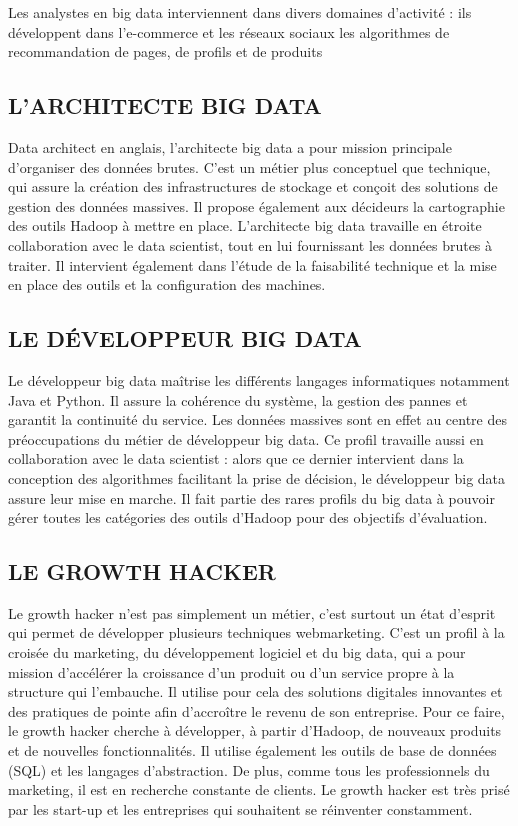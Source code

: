 Les analystes en big data interviennent dans divers domaines d’activité : ils développent dans l’e-commerce et les réseaux sociaux les algorithmes de recommandation de pages, de profils et de produits

\subsection{L’ARCHITECTE BIG DATA}
Data architect en anglais, l’architecte big data a pour mission principale d’organiser des données brutes. C’est un métier plus conceptuel que technique, qui assure la création des infrastructures de stockage et conçoit des solutions de gestion des données massives. Il propose également aux décideurs la cartographie des outils Hadoop à mettre en place. L’architecte big data travaille en étroite collaboration avec le data scientist, tout en lui fournissant les données brutes à traiter. Il intervient également dans l’étude de la faisabilité technique et la mise en place des outils et la configuration des machines.

\subsection{LE DÉVELOPPEUR BIG DATA}
Le développeur big data maîtrise les différents langages informatiques notamment Java et Python. Il assure la cohérence du système, la gestion des pannes et garantit la continuité du service. Les données massives sont en effet au centre des préoccupations du métier de développeur big data. Ce profil travaille aussi en collaboration avec le data scientist : alors que ce dernier intervient dans la conception des algorithmes facilitant la prise de décision, le développeur big data assure leur mise en marche. Il fait partie des rares profils du big data à pouvoir gérer toutes les catégories des outils d’Hadoop pour des objectifs d’évaluation.

\subsection{LE GROWTH HACKER}
Le growth hacker n’est pas simplement un métier, c’est surtout un état d’esprit qui permet de développer plusieurs techniques webmarketing. C’est un profil à la croisée du marketing, du développement logiciel et du big data, qui a pour mission d’accélérer la croissance d’un produit ou d’un service propre à la structure qui l’embauche. Il utilise pour cela des solutions digitales innovantes et des pratiques de pointe afin d’accroître le revenu de son entreprise. Pour ce faire, le growth hacker cherche à développer, à partir d’Hadoop, de nouveaux produits et de nouvelles fonctionnalités. Il utilise également les outils de base de données (SQL) et les langages d’abstraction. De plus, comme tous les professionnels du marketing, il est en recherche constante de clients. Le growth hacker est très prisé par les start-up et les entreprises qui souhaitent se réinventer constamment. 

